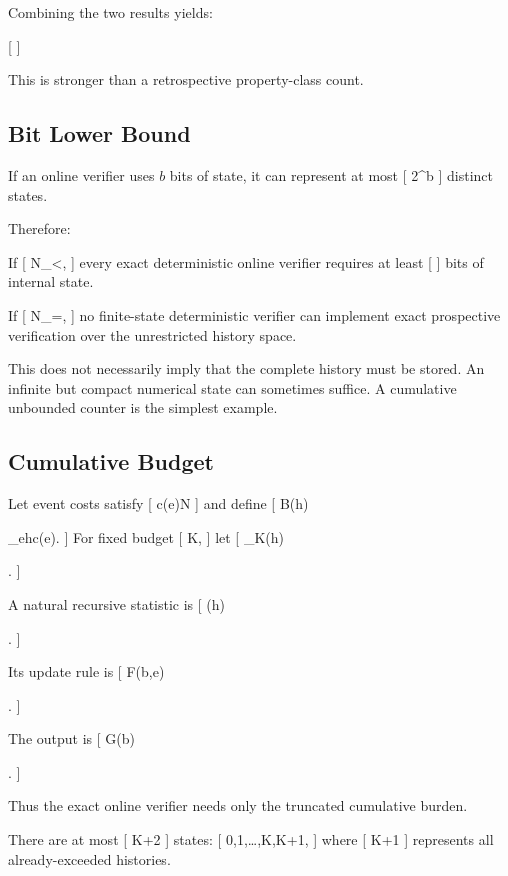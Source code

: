 \documentclass[11pt]{article}
\begin{document}
Combining the two results yields:

[
]

This is stronger than a retrospective property-class count.

\subsection{Bit Lower Bound}

If an online verifier uses $b$ bits of state, it can represent at most
[
2^b
]
distinct states.

Therefore:

\begin{corollary}
If
[
N_\Phi<\infty,
]
every exact deterministic online verifier requires at least
[
]
bits of internal state.
\end{corollary}

If
[
N_\Phi=\infty,
]
no finite-state deterministic verifier can implement exact prospective verification over the unrestricted history space.

This does not necessarily imply that the complete history must be stored. An infinite but compact numerical state can sometimes suffice. A cumulative unbounded counter is the simplest example.

\subsection{Cumulative Budget}

Let event costs satisfy
[
c(e)\in\mathbb N
]
and define
[
B(h)

\sum_{e\in h}c(e).
]
For fixed budget
[
K,
]
let
[
\Phi_K(h)

.
]

A natural recursive statistic is
[
\sigma(h)

.
]

Its update rule is
[
F(b,e)

.
]

The output is
[
G(b)

.
]

Thus the exact online verifier needs only the truncated cumulative burden.

There are at most
[
K+2
]
states:
[
0,1,\ldots,K,K+1,
]
where
[
K+1
]
represents all already-exceeded histories.
\end{document}
